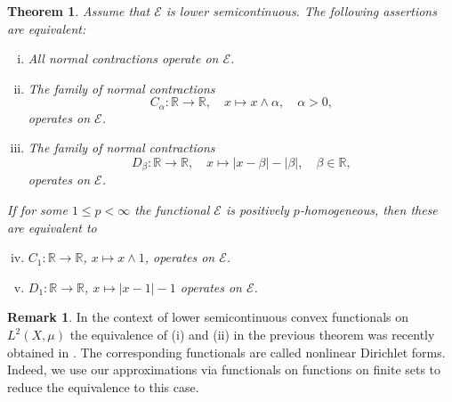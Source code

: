 \documentclass[a4paper,11pt,reqno]{amsart}
\newtheorem{theorem}[lemma]{Theorem}
\theoremstyle{definition}
\newtheorem{remark}[lemma]{Remark}
\numberwithin{equation}{section}
\newcommand{\cE}{{\mathcal E}}
\newcommand{\R}{{\mathbb R}}
\newcommand{\1}{\mathds{1}}
\begin{document}
\begin{theorem}\label{proposition:reduction contraction}
Assume that $\cE$ is lower semicontinuous. The following assertions are equivalent: 
\begin{enumerate}[(i)]
 \item All normal contractions operate on $\cE$. 
 \item The family of normal contractions 
 $$C_\alpha \colon \R \to \R, \quad x \mapsto x \wedge \alpha, \quad \alpha > 0,$$
 operates on $\cE$. 
 \item The family of normal contractions 
$$D_\beta \colon\R \to \R, \quad x \mapsto |x -\beta| - |\beta|, \quad \beta \in \R,$$
 operates on $\cE$. 
\end{enumerate}
%
If for some $1 \leq p < \infty$ the functional $\cE$ is positively $p$-homogeneous, then these are equivalent to 
%
\begin{enumerate}[(i)]  \setcounter{enumi}{3}
 \item $C_1 \colon \R \to \R$, $x \mapsto x \wedge 1$, operates on $\cE$. 
 \item $D_1 \colon\R \to \R$, $x \mapsto |x -1| - 1$ operates on $\cE$. 
\end{enumerate}
\end{theorem}
 
 
 \begin{remark}
  In the context of lower semicontinuous convex functionals on $L^2(X,\mu)$ the equivalence of (i) and (ii) in the previous theorem was recently obtained in \cite[Theorem 2]{Puc25}. The corresponding functionals are called nonlinear Dirichlet forms.  Indeed, we use our approximations via functionals on functions on finite sets to reduce the equivalence to this case. 
 \end{remark}
\end{document}
